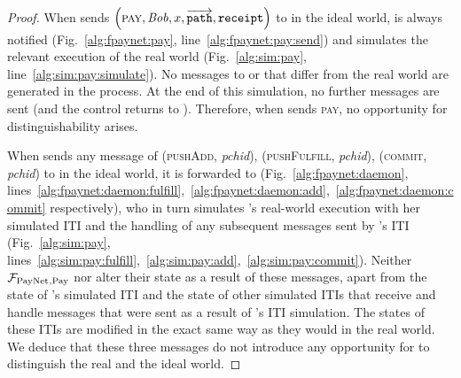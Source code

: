 \begin{proof}
  When \environment{} sends $\left(\textsc{pay}, \mathit{Bob}, x,
  \overrightarrow{\mathtt{path}}, \mathtt{receipt}\right)$ to \alice{} in the
  ideal world, \simulator{} is always notified (Fig.~\ref{alg:fpaynet:pay},
  line~\ref{alg:fpaynet:pay:send}) and simulates the relevant execution of the
  real world (Fig.~\ref{alg:sim:pay}, line~\ref{alg:sim:pay:simulate}). No
  messages to \ledger{} or \environment{} that differ from the real world are
  generated in the process. At the end of this simulation, no further messages
  are sent (and the control returns to \environment). Therefore, when
  \environment{} sends \textsc{pay}, no opportunity for distinguishability
  arises.

  When \environment{} sends any message of (\textsc{pushAdd}, \textit{pchid}),
  (\textsc{pushFulfill}, \textit{pchid}), (\textsc{commit}, \textit{pchid}) to
  \alice{} in the ideal world, it is forwarded to \simulator{}
  (Fig.~\ref{alg:fpaynet:daemon},
  lines~\ref{alg:fpaynet:daemon:fulfill},~\ref{alg:fpaynet:daemon:add},~\ref{alg:fpaynet:daemon:commit}
  respectively), who in turn simulates \alice's real-world execution with her
  simulated ITI and the handling of any subsequent messages sent by \alice's ITI
  (Fig.~\ref{alg:sim:pay},
  lines~\ref{alg:sim:pay:fulfill},~\ref{alg:sim:pay:add},~\ref{alg:sim:pay:commit}).
  Neither $\mathcal{F}_{\mathrm{PayNet}}{}_{\mathrm{, Pay}}$ nor \simulator{} alter their state as a
  result of these messages, apart from the state of \alice's simulated ITI and
  the state of other simulated ITIs that receive and handle messages that were
  sent as a result of \alice's ITI simulation. The states of these ITIs are
  modified in the exact same way as they would in the real world. We deduce that
  these three messages do not introduce any opportunity for \environment{} to
  distinguish the real and the ideal world.


\end{proof}
